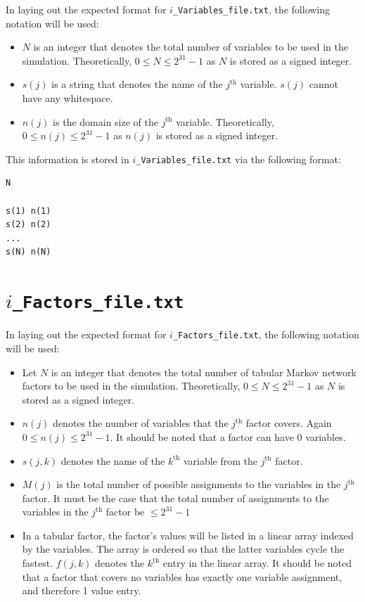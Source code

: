 \documentclass{article}
\begin{document}
In laying out the expected format for \texttt{$i$\_Variables\_file.txt}, the following notation will be used:
\begin{itemize} 
\item $N$ is an integer that denotes the total number of variables to be used in the simulation. Theoretically, $0 \leq N \leq 2^{31} - 1$ as $N$ is stored as a signed integer. 
\item $s(j)$ is a string that denotes the name of the $j^\text{th}$ variable. $s(j)$ cannot have any whitespace. 
\item $n(j)$ is the domain size of the $j^\text{th}$ variable. Theoretically, $0 \leq n(j) \leq 2^{31} - 1$ as $n(j)$ is stored as a signed integer.
\end{itemize}

This information is stored in \texttt{$i$\_Variables\_file.txt} via the following format:
\begin{verbatim}
N

s(1) n(1)
s(2) n(2)
...
s(N) n(N)
\end{verbatim}



\section{\texttt{$i$\_Factors\_file.txt}}

In laying out the expected format for \texttt{$i$\_Factors\_file.txt}, the following notation will be used:
\begin{itemize}
\item Let $N$ is an integer that denotes the total number of tabular Markov network factors to be used in the simulation. Theoretically, $0 \leq N \leq 2^{31} - 1$ as $N$ is stored as a signed integer. 
\item $n(j)$ denotes the number of variables that the $j^\text{th}$ factor covers. Again $0 \leq n(j) \leq 2^{31} - 1$. It should be noted that a factor can have 0 variables. 
\item $s(j,k)$ denotes the name of the $k^\text{th}$ variable from the $j^\text{th}$ factor. 
\item $M(j)$ is the total number of possible assignments to the variables in the $j^\text{th}$ factor. It must be the case that the total number of assignments to the variables in the $j^\text{th}$ factor be $\leq 2^{31} - 1$
\item In a tabular factor, the factor's values will be listed in a linear array indexed by the variables. The array is ordered so that the latter variables cycle the fastest. $f(j,k)$ denotes the $k^\text{th}$ entry in the linear array. It should be noted that a factor that covers no variables has exactly one variable assignment, and therefore 1 value entry.
\end{itemize}
\end{document}
